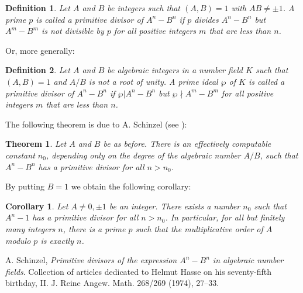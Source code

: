 \documentclass{article}
\newtheorem*{thm}{Theorem}
\newtheorem{defn}{Definition}
\newtheorem*{cor}{Corollary}
\theoremstyle{definition}
\begin{document}
\begin{defn}
Let $A$ and $B$ be integers such that $(A,B)=1$ with $AB\neq \pm 1$. A prime $p$ is called a \emph{primitive divisor} of $A^n-B^n$ if $p$ divides $A^n-B^n$ but $A^m-B^m$ is not divisible by $p$ for all positive integers $m$ that are less than $n$.
\end{defn}

Or, more generally:

\begin{defn}
Let $A$ and $B$ be algebraic integers in a number field $K$ such that $(A,B)=1$ and $A/B$ is not a root of unity. A prime ideal $\wp$ of $K$ is called a \emph{primitive divisor} of $A^n-B^n$ if $\wp|A^n-B^n$ but $\wp \nmid A^m-B^m$ for all positive integers $m$ that are less than $n$.
\end{defn}

The following theorem is due to A. Schinzel (see \cite{sch}):

\begin{thm}
Let $A$ and $B$ be as before. There is an effectively computable constant $n_0$, depending only on the degree of the algebraic number $A/B$, such that $A^n-B^n$ has a primitive divisor for all $n>n_0$.
\end{thm}

By putting $B=1$ we obtain the following corollary:

\begin{cor}
Let $A\neq 0,\pm 1$ be an integer. There exists a number $n_0$ such that $A^n-1$ has a primitive divisor for all $n>n_0$. In particular, for all but finitely many integers $n$, there is a prime $p$ such that the multiplicative order of $A$ modulo $p$ is exactly $n$.
\end{cor}

\begin{thebibliography}{8}
 A. Schinzel, {\em Primitive divisors of the expression $A^n-B^n$ in algebraic number fields}.
Collection of articles dedicated to Helmut Hasse on his seventy-fifth birthday, II. J. Reine Angew. Math. 268/269 (1974), 27--33.
\end{thebibliography}
\end{document}

